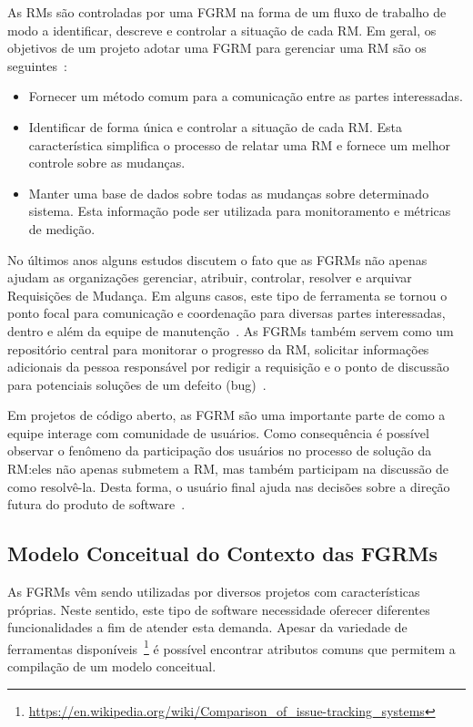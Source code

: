 As RMs são controladas por uma FGRM na forma de um fluxo de trabalho de modo a
identificar, descreve e controlar a situação de cada RM\@. Em geral, os objetivos
de um projeto adotar uma FGRM para gerenciar uma RM são os
seguintes~\cite{tripathy2014software}:

\begin{itemize}
	\item Fornecer um método comum para a comunicação entre as partes
		interessadas.
	\item Identificar de forma única e controlar a situação de cada RM\@. Esta
		característica simplifica o processo de relatar uma RM e fornece um
		melhor controle sobre as mudanças.
	\item Manter uma base de dados sobre todas as mudanças sobre determinado
		sistema. Esta informação pode ser utilizada para monitoramento e
		métricas de medição.
\end{itemize}

No últimos anos alguns estudos discutem o fato que as FGRMs não apenas ajudam
as organizações gerenciar, atribuir, controlar, resolver e arquivar Requisições
de Mudança. Em alguns casos, este tipo de ferramenta se tornou o ponto focal
para comunicação e coordenação para diversas partes interessadas, dentro e além
da equipe de manutenção~\cite{Bertram:2010:CCB:1718918.1718972}.  As FGRMs
também servem como um repositório central para monitorar o progresso da RM,
solicitar informações adicionais da pessoa responsável por redigir a requisição
e o ponto de discussão para potenciais soluções de um defeito
(bug)~\cite{zimmermann2009improving}.

Em projetos de código aberto, as FGRM são uma importante parte de como a equipe
interage com comunidade de usuários. Como consequência é possível observar o
fenômeno da participação dos usuários no processo de solução da RM:\@ eles não
apenas submetem a RM, mas também participam na discussão de como resolvê-la.
Desta forma, o usuário final ajuda nas decisões sobre a direção futura do
produto de software~\cite{breu2010information}.

\subsection{Modelo Conceitual do Contexto das FGRMs}
\label{sub:espectro_funcionalidades_fgrm}

As FGRMs vêm sendo utilizadas por diversos projetos com características
próprias. Neste sentido, este tipo de software necessidade oferecer diferentes
funcionalidades a fim de atender esta demanda. Apesar da variedade de
ferramentas
disponíveis~\footnote{\url{https://en.wikipedia.org/wiki/Comparison_of_issue-tracking_systems}}
é possível encontrar atributos comuns que permitem a compilação de um modelo
conceitual.

